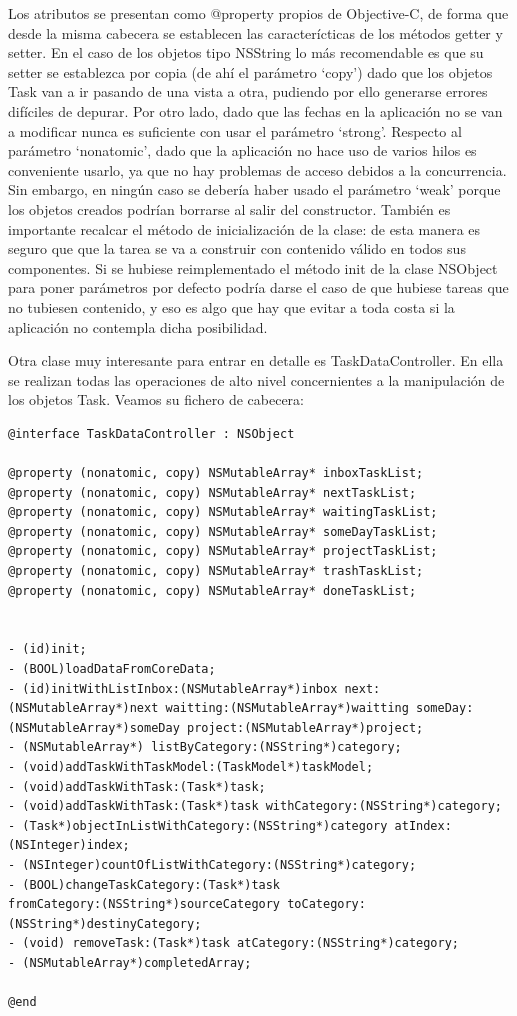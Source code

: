 \documentclass[parskip=half*]{scrartcl}
\begin{document}
Los atributos se presentan como @property propios de Objective-C, de forma que desde la misma cabecera se establecen las caracter\'icticas de los m\'etodos getter y setter. En el caso de los objetos tipo NSString lo m\'as recomendable es que su setter se establezca por copia (de ah\'i el par\'ametro `copy') dado que los objetos Task van a ir pasando de una vista a otra, pudiendo por ello generarse errores dif\'iciles de depurar. Por otro lado, dado que las fechas en la aplicaci\'on no se van a modificar nunca es suficiente con usar el par\'ametro `strong'. Respecto al par\'ametro `nonatomic', dado que la aplicaci\'on no hace uso de varios hilos es conveniente usarlo, ya que no hay problemas de acceso debidos a la concurrencia. Sin embargo, en ning\'un caso se deber\'ia haber usado el par\'ametro `weak' porque los objetos creados podr\'ian borrarse al salir del constructor. Tambi\'en es importante recalcar el m\'etodo de inicializaci\'on de la clase: de esta manera es seguro que que la tarea se va a  construir con contenido v\'alido en todos sus componentes. Si se hubiese reimplementado el m\'etodo init de la clase NSObject para poner par\'ametros por defecto podr\'ia darse el caso de que hubiese tareas que no tubiesen contenido, y eso es algo que hay que evitar a toda costa si la aplicaci\'on no contempla dicha posibilidad.

Otra clase muy interesante para entrar en detalle es TaskDataController. En ella se realizan todas las operaciones de alto nivel concernientes a la manipulaci\'on de los objetos Task. Veamos su fichero de cabecera:

\begin{lstlisting}
@interface TaskDataController : NSObject

@property (nonatomic, copy) NSMutableArray* inboxTaskList;
@property (nonatomic, copy) NSMutableArray* nextTaskList;
@property (nonatomic, copy) NSMutableArray* waitingTaskList;
@property (nonatomic, copy) NSMutableArray* someDayTaskList;
@property (nonatomic, copy) NSMutableArray* projectTaskList;
@property (nonatomic, copy) NSMutableArray* trashTaskList;
@property (nonatomic, copy) NSMutableArray* doneTaskList;


- (id)init;
- (BOOL)loadDataFromCoreData;
- (id)initWithListInbox:(NSMutableArray*)inbox next:(NSMutableArray*)next waitting:(NSMutableArray*)waitting someDay:(NSMutableArray*)someDay project:(NSMutableArray*)project;
- (NSMutableArray*) listByCategory:(NSString*)category;
- (void)addTaskWithTaskModel:(TaskModel*)taskModel;
- (void)addTaskWithTask:(Task*)task;
- (void)addTaskWithTask:(Task*)task withCategory:(NSString*)category;
- (Task*)objectInListWithCategory:(NSString*)category atIndex:(NSInteger)index;
- (NSInteger)countOfListWithCategory:(NSString*)category;
- (BOOL)changeTaskCategory:(Task*)task 
fromCategory:(NSString*)sourceCategory toCategory:(NSString*)destinyCategory;
- (void) removeTask:(Task*)task atCategory:(NSString*)category;
- (NSMutableArray*)completedArray;

@end
\end{lstlisting}
\end{document}
